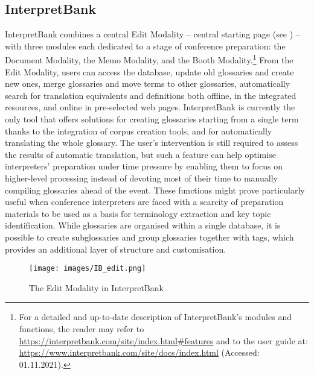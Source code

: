 \subsection{InterpretBank} \label{IB}
InterpretBank combines a central Edit Modality –  central starting page (see ) – with three modules each dedicated to a stage of conference preparation: the Document Modality, the Memo Modality, and the Booth Modality.\footnote{For a detailed and up-to-date description of InterpretBank's modules and functions, the reader may refer to \url{https://interpretbank.com/site/index.html\#features} and to the user guide at: \url{https://www.interpretbank.com/site/docs/index.html} (Accessed: 01.11.2021).} From the Edit Modality, users can access the database, update old glossaries and create new ones, merge glossaries and move terms to other glossaries, automatically search for translation equivalents and definitions both offline, in the integrated resources, and online in pre-selected web pages. InterpretBank is currently the only tool that offers solutions for creating glossaries starting from a single term thanks to the integration of corpus creation tools, and for automatically translating the whole glossary. The user's intervention is still required to assess the results of automatic translation, but such a feature can help optimise interpreters' preparation under time pressure by enabling them to focus on higher-level processing instead of devoting most of their time to manually compiling glossaries ahead of the event. These functions might prove particularly useful when conference interpreters are faced with a scarcity of preparation materials to be used as a basis for terminology extraction and key topic identification. While glossaries are organised within a single database, it is possible to create subglossaries and group glossaries together with tags, which provides an additional layer of structure and customisation.

\begin{figure}
\texttt{[image: images/IB\_edit.png]}
\caption[InterpretBank – Edit Modality]{The Edit Modality in InterpretBank}
\label{fig:IB_edit}
\end{figure}

